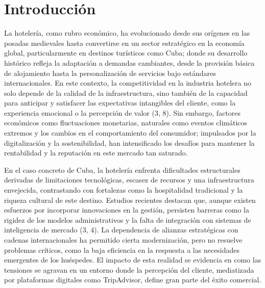 \section*{Introducción}



	
	
	La hotelería, como rubro económico, ha evolucionado desde sus orígenes en las posadas medievales hasta convertirse en un sector estratégico en la economía global, particularmente en destinos turísticos como Cuba; donde su desarrollo histórico refleja la adaptación a demandas cambiantes, desde la provisión básica de alojamiento hasta la personalización de servicios bajo estándares internacionales. En este contexto, la competitividad en la industria hotelera no solo depende de la calidad de la infraestructura, sino también de la capacidad para anticipar y satisfacer las expectativas intangibles del cliente, como la experiencia emocional o la percepción de valor (3, 8). Sin embargo, factores económicos como fluctuaciones monetarias, naturales como eventos climáticos extremos y los cambios en el comportamiento del consumidor; impulsados por la digitalización y la sostenibilidad, han intensificado los desafíos para mantener la rentabilidad y la reputación en este mercado tan saturado.
	
	En el caso concreto de Cuba, la hotelería enfrenta dificultades estructurales derivadas de limitaciones tecnológicas, escasez de recursos y una infraestructura envejecida, contrastando con fortalezas como la hospitalidad tradicional y la riqueza cultural de este destino. Estudios recientes destacan que, aunque existen esfuerzos por incorporar innovaciones en la gestión, persisten barreras como la rigidez de los modelos administrativos y la falta de integración con sistemas de inteligencia de mercado (3, 4). La dependencia de alianzas estratégicas con cadenas internacionales ha permitido cierta modernización, pero no resuelve problemas críticos, como la baja eficiencia en la respuesta a las necesidades emergentes de los huéspedes. El impacto de esta realidad se evidencia en como las tensiones se agravan en un entorno donde la percepción del cliente, mediatizada por plataformas digitales como TripAdvisor, define gran parte del éxito comercial.
	
